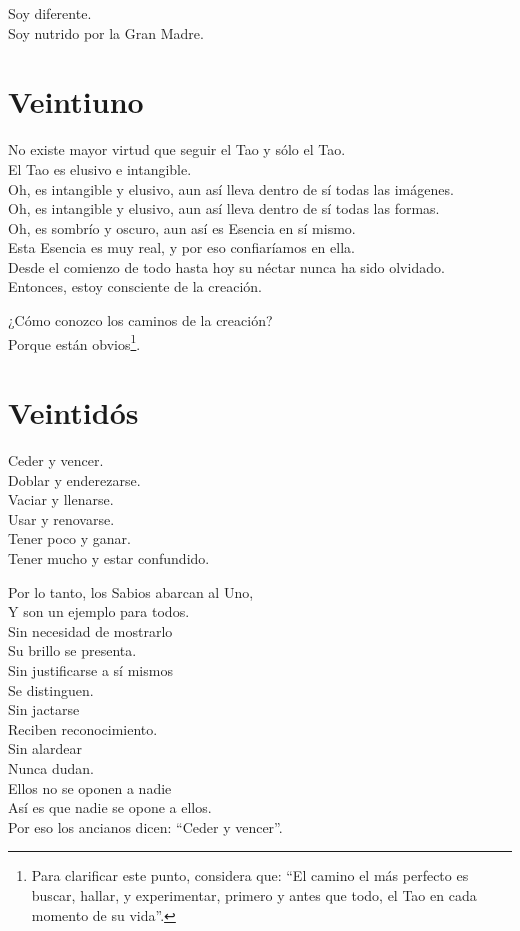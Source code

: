\documentclass[book,b5paper,hidelinks,final]{memoir}
\begin{document}
	Soy diferente.\\
	Soy nutrido por la Gran Madre.
	
	
	
	\chapter*{Veintiuno}
	
	No existe mayor virtud que seguir el Tao y sólo el Tao.\\
	El Tao es elusivo e intangible.\\
	Oh, es intangible y elusivo, aun así lleva dentro de sí todas las
	imágenes.\\
	Oh, es intangible y elusivo, aun así lleva dentro de sí todas las
	formas.\\
	Oh, es sombrío y oscuro, aun así es Esencia en sí mismo.\\
	Esta Esencia es muy real, y por eso confiaríamos en ella.\\
	Desde el comienzo de todo hasta hoy su néctar nunca ha sido olvidado.\\
	Entonces, estoy consciente de la creación.
	
	¿Cómo conozco los caminos de la creación?\\
	Porque están obvios\footnote{Para clarificar este punto, considera que: ``El camino el más perfecto
		es buscar, hallar, y experimentar, primero y antes que todo, el Tao en
		cada momento de su vida''.}.
	
	\chapter*{Veintidós}
	
	Ceder y vencer.\\
	Doblar y enderezarse.\\
	Vaciar y llenarse.\\
	Usar y renovarse.\\
	Tener poco y ganar.\\
	Tener mucho y estar confundido.
	
	Por lo tanto, los Sabios abarcan al Uno,\\
	Y son un ejemplo para todos.\\
	Sin necesidad de mostrarlo\\
	Su brillo se presenta.\\
	Sin justificarse a sí mismos\\
	Se distinguen.\\
	Sin jactarse\\
	Reciben reconocimiento.\\
	Sin alardear\\
	Nunca dudan.\\
	Ellos no se oponen a nadie\\
	Así es que nadie se opone a ellos.\\
	Por eso los ancianos dicen: ``Ceder y vencer''.
	
\end{document}
